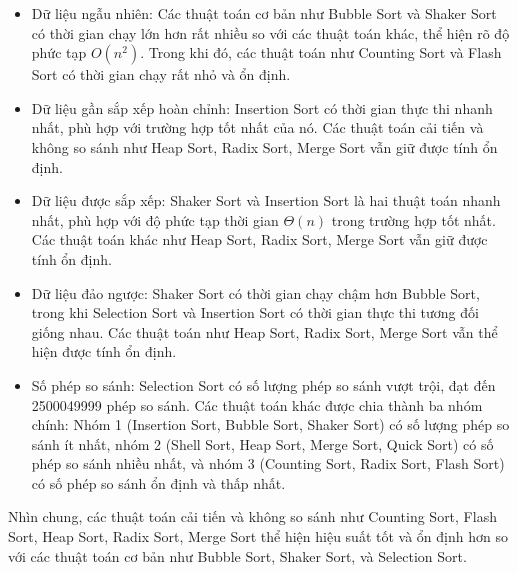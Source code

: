 \begin{itemize}
    \item Dữ liệu ngẫu nhiên: Các thuật toán cơ bản như Bubble Sort và Shaker Sort có thời gian chạy lớn hơn rất nhiều so với các thuật toán khác, thể hiện rõ độ phức tạp $O(n^2)$. Trong khi đó, các thuật toán như Counting Sort và Flash Sort có thời gian chạy rất nhỏ và ổn định.
    \item Dữ liệu gần sắp xếp hoàn chỉnh: Insertion Sort có thời gian thực thi nhanh nhất, phù hợp với trường hợp tốt nhất của nó. Các thuật toán cải tiến và không so sánh như Heap Sort, Radix Sort, Merge Sort vẫn giữ được tính ổn định.
    \item Dữ liệu được sắp xếp: Shaker Sort và Insertion Sort là hai thuật toán nhanh nhất, phù hợp với độ phức tạp thời gian $\Theta(n)$ trong trường hợp tốt nhất. Các thuật toán khác như Heap Sort, Radix Sort, Merge Sort vẫn giữ được tính ổn định.
    \item Dữ liệu đảo ngược: Shaker Sort có thời gian chạy chậm hơn Bubble Sort, trong khi Selection Sort và Insertion Sort có thời gian thực thi tương đối giống nhau. Các thuật toán như Heap Sort, Radix Sort, Merge Sort vẫn thể hiện được tính ổn định.
    \item Số phép so sánh: Selection Sort có số lượng phép so sánh vượt trội, đạt đến 2500049999 phép so sánh. Các thuật toán khác được chia thành ba nhóm chính: Nhóm 1 (Insertion Sort, Bubble Sort, Shaker Sort) có số lượng phép so sánh ít nhất, nhóm 2 (Shell Sort, Heap Sort, Merge Sort, Quick Sort) có số phép so sánh nhiều nhất, và nhóm 3 (Counting Sort, Radix Sort, Flash Sort) có số phép so sánh ổn định và thấp nhất.
\end{itemize}

Nhìn chung, các thuật toán cải tiến và không so sánh như Counting Sort, Flash Sort, Heap Sort, Radix Sort, Merge Sort thể hiện hiệu suất tốt và ổn định hơn so với các thuật toán cơ bản như Bubble Sort, Shaker Sort, và Selection Sort.